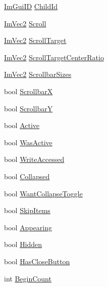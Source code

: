 \begin{DoxyCompactItemize}
\mbox{\hyperlink{imgui_8h_a1785c9b6f4e16406764a85f32582236f}{Im\+Gui\+ID}} \mbox{\hyperlink{struct_im_gui_window_a15e577eef56b4cb52424a989a4a8bc8a}{Child\+Id}}
\item 
\mbox{\hyperlink{struct_im_vec2}{Im\+Vec2}} \mbox{\hyperlink{struct_im_gui_window_abf20537560b9454a1e39667b8f9e7ff2}{Scroll}}
\item 
\mbox{\hyperlink{struct_im_vec2}{Im\+Vec2}} \mbox{\hyperlink{struct_im_gui_window_a77f86bed14712f73d9fb4b8ba2c4d040}{Scroll\+Target}}
\item 
\mbox{\hyperlink{struct_im_vec2}{Im\+Vec2}} \mbox{\hyperlink{struct_im_gui_window_a41f1fde48e59626ea1d19d098cd8ad84}{Scroll\+Target\+Center\+Ratio}}
\item 
\mbox{\hyperlink{struct_im_vec2}{Im\+Vec2}} \mbox{\hyperlink{struct_im_gui_window_a040ebb8ac7de890df6cb6bfe048a72d5}{Scrollbar\+Sizes}}
\item 
bool \mbox{\hyperlink{struct_im_gui_window_a5aeada04ca67b0522677f5cdf5c6b483}{ScrollbarX}}
\item 
bool \mbox{\hyperlink{struct_im_gui_window_ae95f526590e0777de9cf26581a7d6702}{ScrollbarY}}
\item 
bool \mbox{\hyperlink{struct_im_gui_window_a42f141fa0eed059176cb4360df1b1eb2}{Active}}
\item 
bool \mbox{\hyperlink{struct_im_gui_window_ab346ec3a2f305948af05ec1871610a8f}{Was\+Active}}
\item 
bool \mbox{\hyperlink{struct_im_gui_window_a3c29e870f485d115e7715e149c4dfc4d}{Write\+Accessed}}
\item 
bool \mbox{\hyperlink{struct_im_gui_window_a04e6b533b2401d1c7e78b47e31538e7b}{Collapsed}}
\item 
bool \mbox{\hyperlink{struct_im_gui_window_a3e26d0e446eb5864d7dacd6847ec8309}{Want\+Collapse\+Toggle}}
\item 
bool \mbox{\hyperlink{struct_im_gui_window_ac620c64ec2897561f719db266f5e9b05}{Skip\+Items}}
\item 
bool \mbox{\hyperlink{struct_im_gui_window_a158ebb04d20cac09504fdbc4994eb017}{Appearing}}
\item 
bool \mbox{\hyperlink{struct_im_gui_window_a49e0f1e5eff5af0df7da7f4d14aedcce}{Hidden}}
\item 
bool \mbox{\hyperlink{struct_im_gui_window_aebe637a230800210ba67cd8cdd9e71de}{Has\+Close\+Button}}
\item 
int \mbox{\hyperlink{struct_im_gui_window_aa27229a425dc17303be1cd8f4a61c17f}{Begin\+Count}}
\item 

\end{DoxyCompactItemize}
